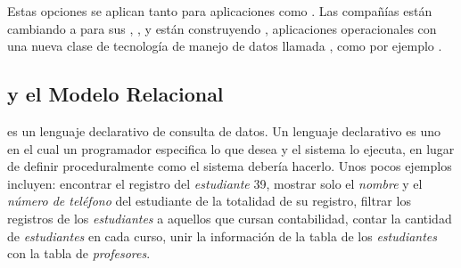 Estas opciones se aplican tanto para aplicaciones \analyticProcessing como \tarnsactionalProcessing. Las compañías están cambiando \workloads a \hadoopNAME para sus \offline, \analytical \workloads, y están construyendo \online, aplicaciones operacionales con una nueva clase de tecnología de manejo de datos llamada \nosqlNAME, como por ejemplo \mongodbNAME.

\subsection{\sqlNAME y el Modelo Relacional}

\sqlNAME es un lenguaje declarativo de consulta de datos. Un lenguaje declarativo es uno en el cual un programador especifica lo que desea y el sistema lo ejecuta, en lugar de definir proceduralmente como el sistema debería hacerlo. Unos pocos ejemplos incluyen: encontrar el registro del \textit{estudiante} 39, mostrar solo el \textit{nombre} y el \textit{número de teléfono} del estudiante de la totalidad de su registro, filtrar los registros de los \textit{estudiantes} a aquellos que cursan contabilidad, contar la cantidad de \textit{estudiantes} en cada curso, unir la información de la tabla de los \textit{estudiantes} con la tabla de \textit{profesores}.


